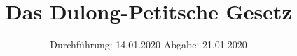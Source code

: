 

\subject{Versuch 201}
\title{Das Dulong-Petitsche Gesetz}
\date{%
  Durchführung: 14.01.2020
  \hspace{3em}
  Abgabe: 21.01.2020
}



\maketitle
\thispagestyle{empty}
\tableofcontents
\newpage






\nocite{*}
\printbibliography{}


